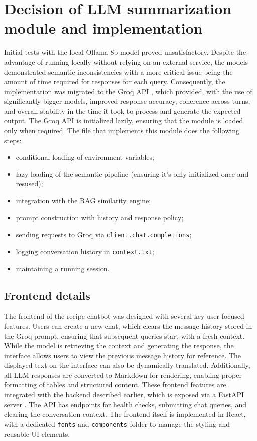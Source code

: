 \documentclass{article}
\begin{document}
\section{Decision of LLM summarization module and implementation}


Initial tests with the local Ollama 8b \cite{llama3_8b_ollama} model proved unsatisfactory. Despite the advantage of running locally without relying on an external service, the models demonstrated semantic inconsistencies with a more critical issue being the amount of time required for responses for each query. Consequently, the implementation was migrated to the Groq API \cite{groq_website}, which provided, with the use of significantly bigger models, improved response accuracy, coherence across turns, and overall stability in the time it took to process and generate the expected output. The Groq API is initialized lazily, ensuring that the module is loaded only when required.
The file that implements this module does the following steps:
\begin{itemize}
    \item conditional loading of environment variables;
    \item lazy loading of the semantic pipeline (ensuring it's only initialized once and resused);
    \item integration with the RAG similarity engine;
    \item prompt construction with history and response policy;
    \item sending requests to Groq via \verb|client.chat.completions|;
    \item logging conversation history in \verb|context.txt|;
    \item maintaining a running session.
\end{itemize}




\subsection{Frontend details}



The frontend of the recipe chatbot was designed with several key user-focused features. Users can create a new chat, which clears the message history stored in the Groq prompt, ensuring that subsequent queries start with a fresh context. While the model is retrieving the context and generating the response, the interface allows users to view the previous message history for reference. The displayed text on the interface can also be dynamically translated. Additionally, all LLM responses are converted to Markdown for rendering, enabling proper formatting of tables and structured content. These frontend features are integrated with the backend described earlier, which is exposed via a FastAPI server \cite{fastapi_docs}. The API has endpoints for health checks, submitting chat queries, and clearing the conversation context. The frontend itself is implemented in React, with a dedicated \texttt{fonts} and \texttt{components} folder to manage the styling and reusable UI elements.
\end{document}
